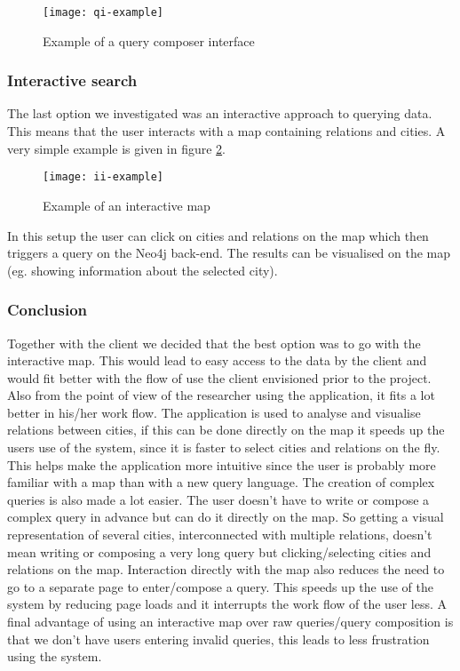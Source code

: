 \begin{figure}[h]
\centering
\texttt{[image: qi-example]}
\caption{Example of a query composer interface}
\label{fig:qi-example}
\end{figure}

\subsubsection{Interactive search}

The last option we investigated was an interactive approach to querying data. This means that the user interacts with a map containing relations and cities. A very simple example is given in figure \ref{fig:ii-example}.


\begin{figure}[h]
\centering
\texttt{[image: ii-example]}
\caption{Example of an interactive map}
\label{fig:ii-example}
\end{figure}

In this setup the user can click on cities and relations on the map which then triggers a query on the Neo4j back-end. The results can be visualised on the map (eg. showing information about the selected city).

\subsubsection{Conclusion}

Together with the client we decided that the best option was to go with the interactive map. This would lead to easy access to the data by the client and would fit better with the flow of use the client envisioned prior to the project. 
Also from the point of view of the researcher using the application, it fits a lot better in his/her work flow. The application is used to analyse and visualise relations between cities, if this can be done directly on the map it speeds up the users use of the system, since it is faster to select cities and relations on the fly. This helps make the application more intuitive since the user is probably more familiar with a map than with a new query language.
The creation of complex queries is also made a lot easier. The user doesn't have to write or compose a complex query in advance but can do it directly on the map. So getting a visual representation of several cities, interconnected with multiple relations, doesn't mean writing or composing a very long query but clicking/selecting cities and relations on the map.
Interaction directly with the map also reduces the need to go to a separate page to enter/compose a query. This speeds up the use of the system by reducing page loads and it interrupts the work flow of the user less.
A final advantage of using an interactive map over raw queries/query composition is that we don't have users entering invalid queries, this leads to less frustration using the system.
